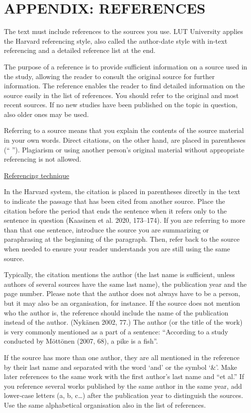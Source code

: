 \chapter{APPENDIX: REFERENCES}\label{appendix:references}
The text must include references to the sources you use. LUT University applies the Harvard referencing style, also called the author-date style with in-text referencing and a detailed reference list at the end.

The purpose of a reference is to provide sufficient information on a source used in the study, allowing the reader to consult the original source for further information. The reference enables the reader to find detailed information on the source easily in the list of references. You should refer to the original and most recent sources. If no new studies have been published on the topic in question, also older ones may be used.

Referring to a source means that you explain the contents of the source material in your own words. Direct citations, on the other hand, are placed in parentheses (“ ”). Plagiarism or using another person’s original material without appropriate referencing is not allowed.

\underline{Referencing technique}

In the Harvard system, the citation is placed in parentheses directly in the text to indicate the passage that has been cited from another source. Place the citation before the period that ends the sentence when it refers only to the sentence in question (Kaasinen et al. 2020, 173–174). If you are referring to more than that one sentence, introduce the source you are summarizing or paraphrasing at the beginning of the paragraph. Then, refer back to the source when needed to ensure your reader understands you are still using the same source.

Typically, the citation mentions the author (the last name is sufficient, unless authors of several sources have the same last name), the publication year and the page number. Please note that the author does not always have to be a person, but it may also be an organisation, for instance. If the source does not mention who the author is, the reference should include the name of the publication instead of the author. (Nykänen 2002, 77.) The author (or the title of the work) is very commonly mentioned as a part of a sentence: “According to a study conducted by Möttönen (2007, 68), a pike is a fish”.

If the source has more than one author, they are all mentioned in the reference by their last name and separated with the word ‘and’ or the symbol ‘\&’. Make later references to the same work with the first author’s last name and “et al.” If you reference several works published by the same author in the same year, add lower-case letters (a, b, c…) after the publication year to distinguish the sources. Use the same alphabetical organisation also in the list of references.

